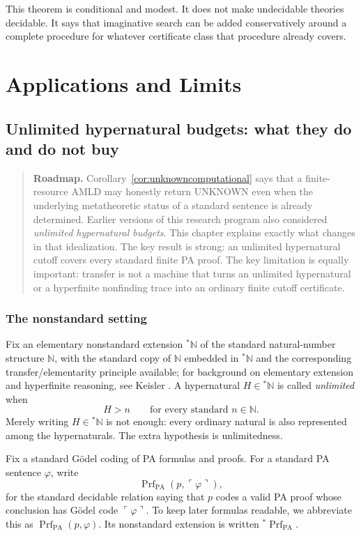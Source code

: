 \documentclass[11pt,openany]{book}
\theoremstyle{definition}
\theoremstyle{remark}
\newenvironment{roadmap}{\begin{quote}\small\color{deepblue}\textbf{Roadmap.} }{\end{quote}}
\newcommand{\N}{\mathbb{N}}
\newcommand{\Prf}{\operatorname{Prf}}
\begin{document}
This theorem is conditional and modest. It does not make undecidable theories decidable. It says that imaginative search can be added conservatively around a complete procedure for whatever certificate class that procedure already covers.

\part{Applications and Limits}

\chapter{Unlimited hypernatural budgets: what they do and do not buy}\label{ch:hyperbudget}
\begin{roadmap}
Corollary~\ref{cor:unknowncomputational} says that a finite-resource AMLD may honestly return \textsf{UNKNOWN} even when the underlying metatheoretic status of a standard sentence is already determined. Earlier versions of this research program also considered \emph{unlimited hypernatural budgets}. This chapter explains exactly what changes in that idealization. The key result is strong: an unlimited hypernatural cutoff covers every standard finite PA proof. The key limitation is equally important: transfer is not a machine that turns an unlimited hypernatural or a hyperfinite nonfinding trace into an ordinary finite cutoff certificate.
\end{roadmap}

\section{The nonstandard setting}
Fix an elementary nonstandard extension ${}^*\N$ of the standard natural-number structure $\N$, with the standard copy of $\N$ embedded in ${}^*\N$ and the corresponding transfer/elementarity principle available; for background on elementary extension and hyperfinite reasoning, see Keisler \cite{KeislerFoundations}. A hypernatural $H\in{}^*\N$ is called \emph{unlimited} when
\[
H>n\qquad\text{for every standard }n\in\N.
\]
Merely writing $H\in{}^*\N$ is not enough: every ordinary natural is also represented among the hypernaturals. The extra hypothesis is unlimitedness.

Fix a standard G\"odel coding of PA formulas and proofs. For a standard PA sentence $\varphi$, write
\[
\Prf_{\mathrm{PA}}(p,\ulcorner\varphi\urcorner),
\]
for the standard decidable relation saying that $p$ codes a valid PA proof whose conclusion has G\"odel code $\ulcorner\varphi\urcorner$. To keep later formulas readable, we abbreviate this as $\Prf_{\mathrm{PA}}(p,\varphi)$. Its nonstandard extension is written ${}^*\!\Prf_{\mathrm{PA}}$.
\end{document}
